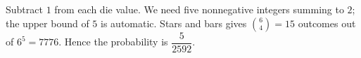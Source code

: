 Subtract $1$ from each die value. We need five nonnegative integers summing to $2$; the upper bound of $5$ is automatic. Stars and bars gives $\binom64=15$ outcomes out of $6^5=7776$. Hence the probability is $\boxed{\dfrac{5}{2592}}$.
